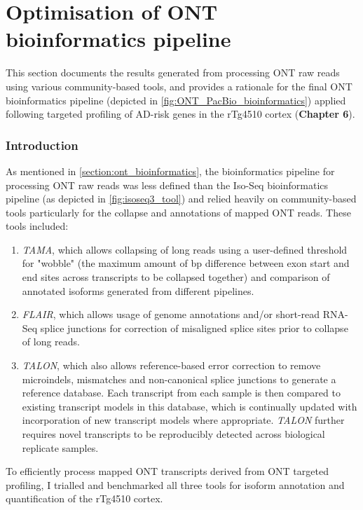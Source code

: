 \cleardoublepage
\chapter{Optimisation of ONT bioinformatics pipeline}\label{app_ONTBioinformatics}
\label{ONT_Bioinformatics_appendix}

\stoptocwriting
This section documents the results generated from processing ONT raw reads using various community-based tools, and provides a rationale for the final ONT bioinformatics pipeline (depicted in \cref{fig:ONT_PacBio_bioinformatics}) applied following targeted profiling of AD-risk genes in the rTg4510 cortex (\textbf{Chapter 6}). 

\subsection{Introduction}
As mentioned in \cref{section:ont_bioinformatics}, the bioinformatics pipeline for processing ONT raw reads was less defined than the Iso-Seq bioinformatics pipeline (as depicted in \cref{fig:isoseq3_tool}) and relied heavily on community-based tools particularly for the collapse and annotations of mapped ONT reads. These tools included:
\begin{enumerate}
	\item \textit{TAMA}, which allows collapsing of long reads using a user-defined threshold for "wobble" (the maximum amount of bp difference between exon start and end sites across transcripts to be collapsed together) and comparison of annotated isoforms generated from different pipelines.
	\item \textit{FLAIR}, which allows usage of genome annotations and/or short-read RNA-Seq splice junctions for correction of misaligned splice sites prior to collapse of long reads.  
	\item \textit{TALON}, which also allows reference-based error correction to remove microindels, mismatches and non-canonical splice junctions to generate a reference database. Each transcript from each sample is then compared to existing transcript models in this database, which is continually updated with incorporation of new transcript models where appropriate. \textit{TALON} further requires novel transcripts to be reproducibly detected across biological replicate samples. 
\end{enumerate}
To efficiently process mapped ONT transcripts derived from ONT targeted profiling, I trialled and benchmarked all three tools for isoform annotation and quantification of the rTg4510 cortex. 

